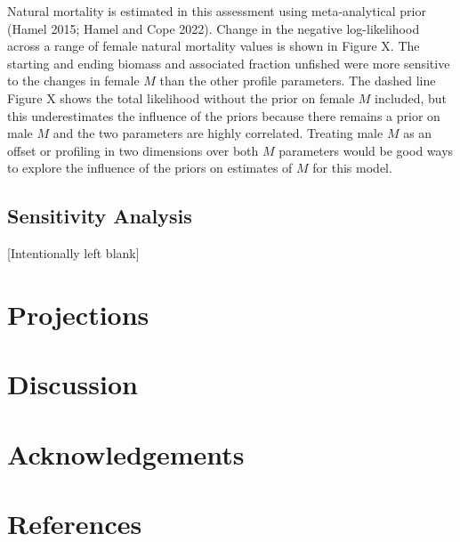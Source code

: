 \documentclass[
]{scrartcl}
\begin{document}
Natural mortality is estimated in this assessment using meta-analytical
prior (Hamel 2015; Hamel and Cope 2022). Change in the negative
log-likelihood across a range of female natural mortality values is
shown in Figure X. The starting and ending biomass and associated
fraction unfished were more sensitive to the changes in female \(M\)
than the other profile parameters. The dashed line Figure X shows the
total likelihood without the prior on female \(M\) included, but this
underestimates the influence of the priors because there remains a prior
on male \(M\) and the two parameters are highly correlated. Treating
male \(M\) as an offset or profiling in two dimensions over both \(M\)
parameters would be good ways to explore the influence of the priors on
estimates of \(M\) for this model.

\subsection{Sensitivity Analysis}\label{sensitivity-analysis}

{[}Intentionally left blank{]}

\newpage{}

\section{Projections}\label{projections}

\newpage{}

\section{Discussion}\label{discussion}

\newpage{}

\section{Acknowledgements}\label{acknowledgements}

\newpage{}

\section{References}\label{references}
\end{document}
